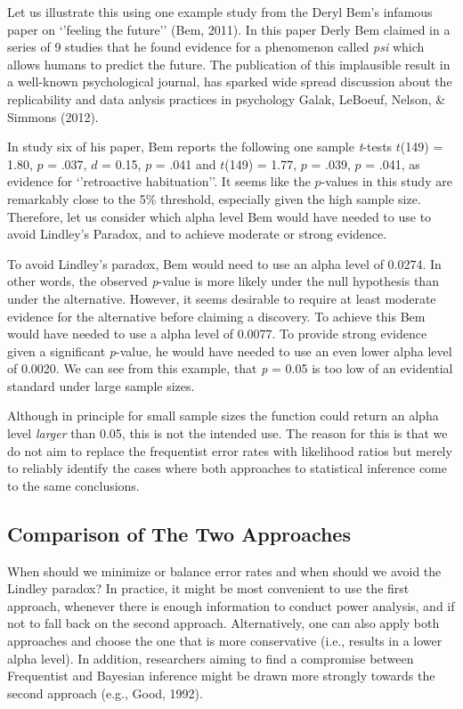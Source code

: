 \documentclass[
  english,
  ,man,floatsintext]{apa6}
\begin{document}
Let us illustrate this using one example study from the Deryl Bem's infamous paper on `'feeling the future'' (Bem, 2011). In this paper Derly Bem claimed in a series of 9 studies that he found evidence for a phenomenon called \emph{psi} which allows humans to predict the future. The publication of this implausible result in a well-known psychological journal, has sparked wide spread discussion about the replicability and data anlysis practices in psychology Galak, LeBoeuf, Nelson, \& Simmons (2012).

In study six of his paper, Bem reports the following one sample \emph{t}-tests \(t\)(149) = 1.80, \(p\) = .037, \(d\) = 0.15, \(p\) = .041 and \(t\)(149) = 1.77, \(p\) = .039, \(p\) = .041, as evidence for `'retroactive habituation''. It seems like the \(p\)-values in this study are remarkably close to the 5\% threshold, especially given the high sample size. Therefore, let us consider which alpha level Bem would have needed to use to avoid Lindley's Paradox, and to achieve moderate or strong evidence.

To avoid Lindley's paradox, Bem would need to use an alpha level of 0.0274. In other words, the observed \emph{p}-value is more likely under the null hypothesis than under the alternative. However, it seems desirable to require at least moderate evidence for the alternative before claiming a discovery. To achieve this Bem would have needed to use a alpha level of 0.0077. To provide strong evidence given a significant \emph{p}-value, he would have needed to use an even lower alpha level of 0.0020. We can see from this example, that \emph{p} = 0.05 is too low of an evidential standard under large sample sizes.

Although in principle for small sample sizes the function could return an alpha level \emph{larger} than 0.05, this is not the intended use. The reason for this is that we do not aim to replace the frequentist error rates with likelihood ratios but merely to reliably identify the cases where both approaches to statistical inference come to the same conclusions.

\hypertarget{comparison-of-the-two-approaches}{%
\subsection{Comparison of The Two Approaches}\label{comparison-of-the-two-approaches}}

When should we minimize or balance error rates and when should we avoid the Lindley paradox? In practice, it might be most convenient to use the first approach, whenever there is enough information to conduct power analysis, and if not to fall back on the second approach. Alternatively, one can also apply both approaches and choose the one that is more conservative (i.e., results in a lower alpha level). In addition, researchers aiming to find a compromise between Frequentist and Bayesian inference might be drawn more strongly towards the second approach (e.g., Good, 1992).
\end{document}
